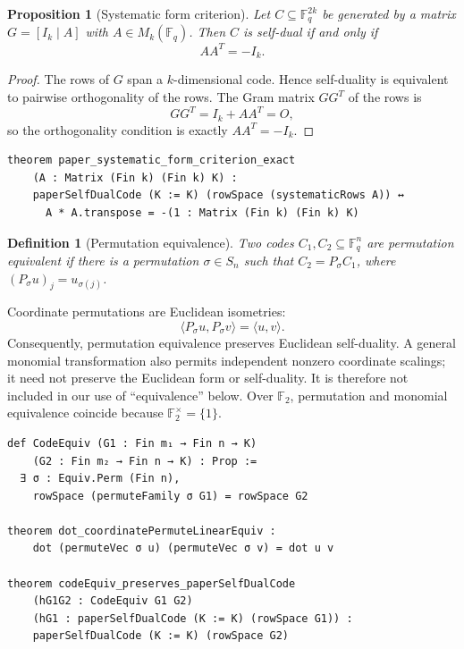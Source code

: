 \documentclass[12pt]{article}
\newtheorem{defn}{Definition}[section]
\newtheorem{prop}[theorem]{Proposition}
\newcommand{\F}{\mathbb{F}}
\begin{document}
\begin{prop}[Systematic form criterion]\label{prop:systematic-form}
Let $C \subseteq \F_q^{2k}$ be generated by a matrix $G = [I_k \mid A]$ with $A \in M_k(\F_q)$. Then $C$ is self-dual if and only if
\[
AA^T = -I_k.
\]
\end{prop}

\begin{proof}
The rows of $G$ span a $k$-dimensional code. Hence self-duality is equivalent to pairwise orthogonality of the rows. The Gram matrix $GG^T$ of the rows is
\[
GG^T = I_k + AA^T = O,
\]
so the orthogonality condition is exactly $AA^T = -I_k$.
\end{proof}

\begin{lstlisting}[caption={Lean for Proposition~\ref{prop:systematic-form}.}]
theorem paper_systematic_form_criterion_exact
    (A : Matrix (Fin k) (Fin k) K) :
    paperSelfDualCode (K := K) (rowSpace (systematicRows A)) ↔
      A * A.transpose = -(1 : Matrix (Fin k) (Fin k) K)
\end{lstlisting}

\begin{defn}[Permutation equivalence]\label{def:perm-equiv}
{\rm
Two codes $C_1,C_2\subseteq\F_q^n$ are \emph{permutation equivalent}
if there is a permutation \(\sigma\in S_n\) such that
\(C_2=P_\sigma C_1\), where
\((P_\sigma u)_j=u_{\sigma(j)}\).
}
\end{defn}

Coordinate permutations are Euclidean isometries:
\[
\langle P_\sigma u,P_\sigma v\rangle=\langle u,v\rangle.
\]
Consequently, permutation equivalence preserves Euclidean self-duality.
A general monomial transformation also permits independent nonzero
coordinate scalings; it need not preserve the Euclidean form or
self-duality. It is therefore not included in our use of ``equivalence''
below. Over \(\F_2\), permutation and monomial equivalence coincide because
\(\F_2^\times=\{1\}\).

\begin{lstlisting}[caption={Lean for Definition~\ref{def:perm-equiv}.}]
def CodeEquiv (G1 : Fin m₁ → Fin n → K)
    (G2 : Fin m₂ → Fin n → K) : Prop :=
  ∃ σ : Equiv.Perm (Fin n),
    rowSpace (permuteFamily σ G1) = rowSpace G2

theorem dot_coordinatePermuteLinearEquiv :
    dot (permuteVec σ u) (permuteVec σ v) = dot u v

theorem codeEquiv_preserves_paperSelfDualCode
    (hG1G2 : CodeEquiv G1 G2)
    (hG1 : paperSelfDualCode (K := K) (rowSpace G1)) :
    paperSelfDualCode (K := K) (rowSpace G2)
\end{lstlisting}
\end{document}
